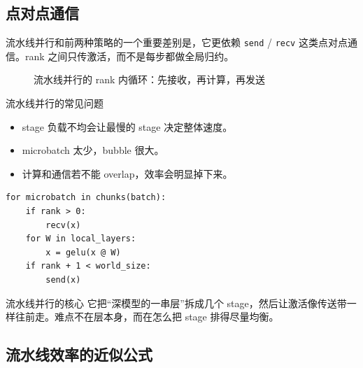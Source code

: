 \subsection{点对点通信}

流水线并行和前两种策略的一个重要差别是，它更依赖 \texttt{send} / \texttt{recv} 这类点对点通信。rank 之间只传激活，而不是每步都做全局归约。

\begin{figure}[H]
\centering
{}
\caption{流水线并行的 rank 内循环：先接收，再计算，再发送}
\end{figure}

\begin{warningbox}{流水线并行的常见问题}
\begin{itemize}
    \item stage 负载不均会让最慢的 stage 决定整体速度。
    \item microbatch 太少，bubble 很大。
    \item 计算和通信若不能 overlap，效率会明显掉下来。
\end{itemize}
\end{warningbox}

\begin{lstlisting}[caption={流水线并行的极简理解},label={lst:pp}]
for microbatch in chunks(batch):
    if rank > 0:
        recv(x)
    for W in local_layers:
        x = gelu(x @ W)
    if rank + 1 < world_size:
        send(x)
\end{lstlisting}

\begin{knowledgebox}{流水线并行的核心}
它把“深模型的一串层”拆成几个 stage，然后让激活像传送带一样往前走。难点不在层本身，而在怎么把 stage 排得尽量均衡。
\end{knowledgebox}

\subsection{流水线效率的近似公式}

